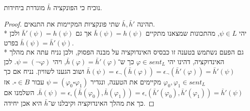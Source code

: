\Subquestion{}
נוכיח כי הפונקציה $\bar{h}$ מוגדרת ביחידות.
\begin{proof}
	תהינה $\bar{h}, \bar{h}'$ שתי פונקציות המקיימות את התנאים. \\*
	יהי $\psi \in L$, מהתכונות שמצאנו מתקיים $\bar{h}(\psi) = h(\psi)$ אך גם $\bar{h}'(\psi) = h(\psi)$ ולכן בפרט $\bar{h}(\psi) = \bar{h}'(\psi)$. \\*
	גם הפעם נשתמש בטענה זו כבסיס האינדוקציה על מבנה הפסוק, ולכן נניח עתה את מהלך האינדוקציה, דהינו יהי $\varphi \in sent_L$ כך ש־$\bar{h}(\varphi) = \bar{h}'(\varphi)$, ויהי $\psi = (\lnot \varphi)$.
	לכן $\bar{h}(\psi) = \epsilon_\lnot(\bar{h}(\varphi)) = \epsilon_\lnot(\bar{h}'(\varphi)) = \bar{h}'(\psi)$ ושוב הגענו לשוויון.
	נניח אם כך $\varphi_0, \varphi_1 \in sent_L$ מקיימים את הטענה, ונגדיר $\psi = (\varphi_0 \square \varphi_1)$ עבור $\square \in B$.
	אז $\bar{h}(\psi) = \epsilon_\square(\bar{h}(\varphi_0), \bar{h}(\varphi_1)) = \epsilon_\square(\bar{h}'(\varphi_0), \bar{h}'(\varphi_1)) = \bar{h}'(\psi)$.
	השלמנו אם כך את מהלך האינדוקציה וקיבלנו ש־$\bar{h}$ היא אכן יחידה.
\end{proof}


